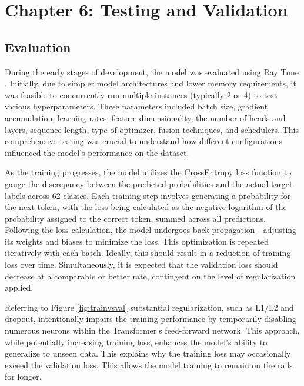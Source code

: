 \documentclass[preprint,11pt,review,authoryear]{elsarticle}
\begin{document}
\newpage 
\section{Chapter 6: Testing and Validation}

\subsection{Evaluation}

During the early stages of development, the model was evaluated using Ray Tune \citep{RayTrainScalable}. Initially, due to simpler model architectures and lower memory requirements, it was feasible to concurrently run multiple instances (typically 2 or 4) to test various hyperparameters. These parameters included batch size, gradient accumulation, learning rates, feature dimensionality, the number of heads and layers, sequence length, type of optimizer, fusion techniques, and schedulers. This comprehensive testing was crucial to understand how different configurations influenced the model's performance on the dataset.

As the training progresses, the model utilizes the CrossEntropy loss function to gauge the discrepancy between the predicted probabilities and the actual target labels across 62 classes. Each training step involves generating a probability for the next token, with the loss being calculated as the negative logarithm of the probability assigned to the correct token, summed across all predictions. Following the loss calculation, the model undergoes back propagation—adjusting its weights and biases to minimize the loss. This optimization is repeated iteratively with each batch. Ideally, this should result in a reduction of training loss over time. Simultaneously, it is expected that the validation loss should decrease at a comparable or better rate, contingent on the level of regularization applied.

Referring to Figure \ref{fig:trainvsval} substantial regularization, such as L1/L2 and dropout, intentionally impairs the training performance by temporarily disabling numerous neurons within the Transformer's feed-forward network. This approach, while potentially increasing training loss, enhances the model's ability to generalize to unseen data. This explains why the training loss may occasionally exceed the validation loss. This allows the model training to remain on the rails for longer.
\end{document}
